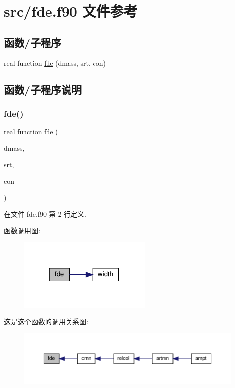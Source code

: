 \hypertarget{fde_8f90}{}\section{src/fde.f90 文件参考}
\label{fde_8f90}
\subsection*{函数/子程序}
\begin{DoxyCompactItemize}
\item 
real function \mbox{\hyperlink{fde_8f90_a527a2f97236058cba729d026b8566e5a}{fde}} (dmass, srt, con)
\end{DoxyCompactItemize}


\subsection{函数/子程序说明}
\mbox{\label{fde_8f90_a527a2f97236058cba729d026b8566e5a}} 
\subsubsection{\texorpdfstring{fde()}{fde()}}
{\footnotesize\ttfamily real function fde (\begin{DoxyParamCaption}\item[{}]{dmass,  }\item[{}]{srt,  }\item[{}]{con }\end{DoxyParamCaption})}



在文件 fde.\+f90 第 2 行定义.

函数调用图\+:
\nopagebreak
\begin{figure}[H]
\begin{center}
\leavevmode
\includegraphics[width=186pt]{fde_8f90_a527a2f97236058cba729d026b8566e5a_cgraph}
\end{center}
\end{figure}
这是这个函数的调用关系图\+:
\nopagebreak
\begin{figure}[H]
\begin{center}
\leavevmode
\includegraphics[width=350pt]{fde_8f90_a527a2f97236058cba729d026b8566e5a_icgraph}
\end{center}
\end{figure}
